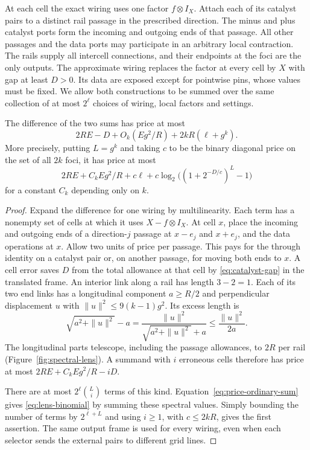 At each cell the exact wiring uses one factor $f\otimes I_X$. Attach
each of its catalyst pairs to a distinct rail passage in the prescribed
direction. The minus and plus catalyst ports form the incoming and
outgoing ends of that passage. All other passages and the data ports
may participate in an arbitrary local contraction. The rails supply all
intercell connections, and their endpoints at the foci are the only
outputs. The approximate wiring replaces the factor at every cell by
$X$ with gap at least $D>0$. Its data are exposed except for pointwise
pins, whose values must be fixed. We allow both constructions to be
summed over the same collection of at most $2^\ell$ choices of wiring,
local factors and settings.

\begin{lemma}\label{lem:lens}
The difference of the two sums has price at most
\[
  2RE-D+O_k(Eg^2/R)+2kR(\ell+g^k).
\]
More precisely, putting $L=g^k$ and taking $c$ to be the binary diagonal
price on the set of all $2k$ foci, it has price at most
\begin{equation}\label{eq:lens-binomial}
  2RE+C_k Eg^2/R+c\ell+
       c\log_2\big((1+2^{-D/c})^L-1\big)
\end{equation}
for a constant $C_k$ depending only on $k$.
\end{lemma}

\begin{proof}
Expand the difference for one wiring by multilinearity. Each term has
a nonempty set of cells at which it uses $X-f\otimes I_X$. At cell $x$,
place the incoming and outgoing ends of a direction-$j$ passage at
$x-e_j$ and $x+e_j$, and the data operations at $x$. Allow two units of
price per passage. This pays for the through identity on a catalyst pair
or, on another passage, for moving both ends to $x$. A cell error saves $D$ from the total allowance at that
cell by \eqref{eq:catalyst-gap} in the translated frame. An interior link
along a rail has length $3-2=1$. Each of its two end links has a longitudinal
component $a\ge R/2$ and perpendicular displacement $u$ with
$\|u\|^2\le 9(k-1)g^2$. Its excess length is
\[
   \sqrt{a^2+\|u\|^2}-a
      =\frac{\|u\|^2}{\sqrt{a^2+\|u\|^2}+a}
      \le \frac{\|u\|^2}{2a}.
\]
The longitudinal parts telescope, including the passage allowances, to $2R$
per rail (Figure~\ref{fig:spectral-lens}). A summand with $i$ erroneous
cells therefore has price at most $2RE+C_kEg^2/R-iD$.

There are at most $2^\ell\binom{L}{i}$ terms of this kind.
Equation~\eqref{eq:price-ordinary-sum} gives \eqref{eq:lens-binomial} by
summing these spectral values. Simply bounding the number of terms by
$2^{\ell+L}$ and using $i\ge1$, with $c\le2kR$, gives the first assertion.
The same output frame is used for every wiring, even when each selector sends
the external pairs to different grid lines.
\end{proof}

